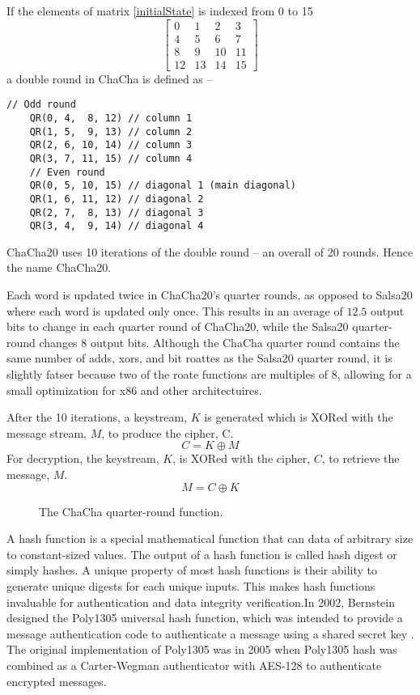 \documentclass{article}
\begin{document}
If the elements of matrix \ref{initialState} is indexed from 0 to 15
\[\left[
        \begin{array}{cccc}
            0  & 1  & 2  & 3  \\
            4  & 5  & 6  & 7  \\
            8  & 9  & 10 & 11 \\
            12 & 13 & 14 & 15
        \end{array}
        \right]\]
a double round in ChaCha is defined as --
\begin{lstlisting}[basicstyle=\ttfamily,frame=none]
    // Odd round
    QR(0, 4,  8, 12) // column 1
    QR(1, 5,  9, 13) // column 2
    QR(2, 6, 10, 14) // column 3
    QR(3, 7, 11, 15) // column 4
    // Even round
    QR(0, 5, 10, 15) // diagonal 1 (main diagonal)
    QR(1, 6, 11, 12) // diagonal 2
    QR(2, 7,  8, 13) // diagonal 3
    QR(3, 4,  9, 14) // diagonal 4
\end{lstlisting}
ChaCha20 uses 10 iterations of the double round -- an overall of 20 rounds. Hence the name ChaCha20.

Each word is updated twice in ChaCha20's quarter rounds, as opposed to Salsa20 where each word is updated only once. This results in an average of $12.5$ output bits to change in each quarter round of ChaCha20, while the Salsa20 quarter-round changes 8 output bits. Although the ChaCha quarter round contains the same number of adds, xors, and bit roattes as the Salsa20 quarter round, it is slightly fatser because two of the roate functions are multiples of 8, allowing for a small optimization for x86 and other architectuires.

After the 10 iterations, a keystream, $K$ is generated which is XORed with the message stream, $M$, to produce the cipher, C.
\[C = K \oplus M\]
For decryption, the keystream, $K$, is XORed with the cipher, $C$, to retrieve the message, $M$.
\[M = C \oplus K\]
\begin{figure}[!h]
    \centering
    
    \caption{The ChaCha quarter-round function.}
\end{figure}

A hash function is a special mathematical function that can data of arbitrary size to constant-sized values. The output of a hash function is called hash digest or simply hashes. A unique property of most hash functions is their ability to generate unique digests for each unique inputs. This makes hash functions invaluable for authentication and data integrity verification.In 2002, Bernstein designed the Poly1305 universal hash function, which was intended to provide a message authentication code to authenticate a message using a shared secret key \cite{bernstein2005protecting}. The original implementation of Poly1305 was in 2005 when Poly1305 hash was combined as a Carter-Wegman authenticator \cite{carter1981new} with AES-128 to authenticate encrypted messages.
\end{document}
